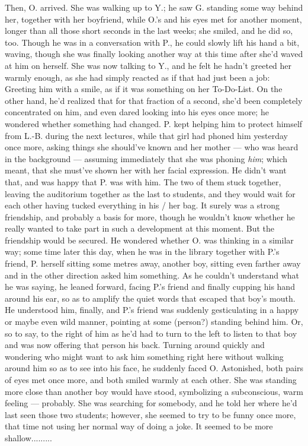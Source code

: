 Then, O. arrived. 
She was walking up to Y.; he saw G. standing some way behind her, together with her boyfriend, while O.'s and his eyes met for another moment, longer than all those short seconds in the last weeks; she smiled, and he did so, too. Though he was in a conversation with P., he could slowly lift his hand a bit, waving, though she was finally looking another way at this time after she'd waved at him on herself. She was now talking to Y., and he felt he hadn't greeted her warmly enough, as she had simply reacted as if that had just been a job: Greeting him with a smile, as if it was something on her To-Do-List. On the other hand, he'd realized that for that fraction of a second, she'd been completely concentrated on him, and even dared looking into his eyes once more; he wondered whether something had changed. P. kept helping him to protect himself from L.-B. during the next lectures, while that girl had phoned him yesterday once more, asking things she should've known and her mother --- who was heard in the background --- assuming immediately that she was phoning \emph{him}; which meant, that she must've shown her with her facial expression. 
He didn't want that, and was happy that P. was with him. The two of them stuck together, leaving the auditorium together as the last to students, and they would wait for each other having tucked everything in his / her bag. It surely was a strong friendship, and probably a basis for more, though he wouldn't know whether he really wanted to take part in such a development at this moment. But the friendship would be secured. 
He wondered whether O. was thinking in a similar way; some time later this day, when he was in the library together with P.'s friend, P. herself sitting some metres away, another boy, sitting even farther away and in the other direction asked him something. As he couldn't understand what he was saying, he leaned forward, facing P.'s friend and finally cupping his hand around his ear, so as to amplify the quiet words that escaped that boy's mouth. He understood him, finally, and P.'s friend was suddenly gesticulating in a happy or maybe even wild manner, pointing at some (person?) standing behind him. Or, so to say, to the right of him as he'd had to turn to the left to listen to that boy and was now offering that person his back. Turning around quickly and wondering who might want to ask him something right here without walking around him so as to see into his face, he suddenly faced O. Astonished, both pairs of eyes met once more, and both smiled warmly at each other. She was standing more close than another boy would have stood, symbolizing a subconscious, warm feeling --- probably. She was searching for somebody, and he told her where he'd last seen those two students; however, she seemed to try to be funny once more, that time not using her normal way of doing a joke. It seemed to be more shallow.........
